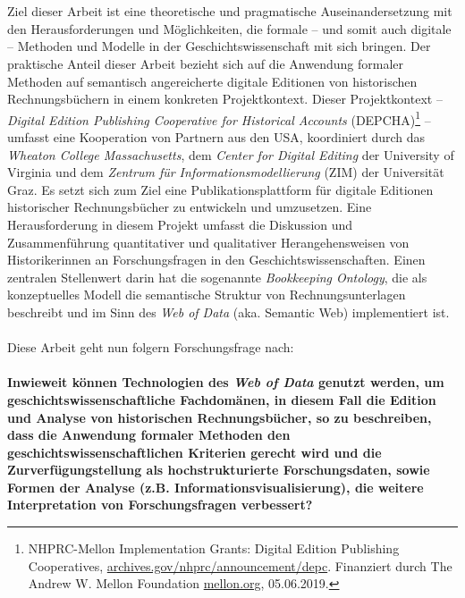 \documentclass[12pt,a4paper]{article}
\begin{document}
\\
\\
Ziel dieser Arbeit ist eine theoretische und pragmatische Auseinandersetzung mit den Herausforderungen und Möglichkeiten, die formale -- und somit auch digitale -- Methoden und Modelle in der Geschichtswissenschaft mit sich bringen. Der praktische Anteil dieser Arbeit bezieht sich auf die Anwendung formaler Methoden auf semantisch angereicherte digitale Editionen von historischen Rechnungsbüchern in einem konkreten Projektkontext. Dieser Projektkontext -- \textit{Digital Edition Publishing Cooperative for Historical Accounts} (DEPCHA)\footnote{NHPRC-Mellon Implementation Grants: Digital Edition Publishing Cooperatives, \url{archives.gov/nhprc/announcement/depc}. Finanziert durch The Andrew W. Mellon Foundation \url{ mellon.org}, 05.06.2019.} -- umfasst eine Kooperation von Partnern aus den USA, koordiniert durch das \textit{Wheaton College Massachusetts}, dem \textit{Center for Digital Editing} der University of Virginia und dem \textit{Zentrum für Informationsmodellierung} (ZIM) der Universität Graz. Es setzt sich zum Ziel eine Publikationsplattform für digitale Editionen historischer Rechnungsbücher zu entwickeln und umzusetzen. Eine Herausforderung in diesem Projekt umfasst die Diskussion und Zusammenführung quantitativer und qualitativer Herangehensweisen von Historikerinnen an Forschungsfragen in den Geschichtswissenschaften. Einen zentralen Stellenwert darin hat die sogenannte \textit{Bookkeeping Ontology}, die als konzeptuelles Modell die semantische Struktur von Rechnungsunterlagen beschreibt und im Sinn des \textit{Web of Data} (aka. Semantic Web) implementiert ist.
\\
\\
Diese Arbeit geht nun folgern Forschungsfrage nach:
\\
\\
\textbf{Inwieweit können Technologien des \textit{Web of Data} genutzt werden, um geschichtswissenschaftliche Fachdomänen, in diesem Fall die Edition und Analyse von historischen Rechnungsbücher, so zu beschreiben, dass die Anwendung formaler Methoden den geschichtswissenschaftlichen Kriterien gerecht wird und die Zurverfügungstellung als hochstrukturierte Forschungsdaten, sowie Formen der Analyse (z.B. Informationsvisualisierung), die weitere Interpretation von Forschungsfragen verbessert?} 
\end{document}
